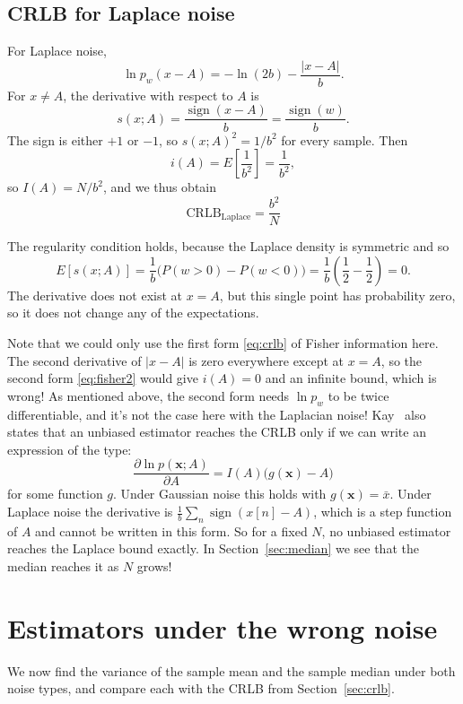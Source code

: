 \documentclass[11pt]{article}
\numberwithin{figure}{section}
\numberwithin{equation}{section}
\begin{document}
\subsection{CRLB for Laplace noise}

For Laplace noise,
\[
  \ln p_w(x - A) = -\ln(2b) - \frac{|x - A|}{b}.
\]
For $x \neq A$, the derivative with respect to $A$ is
\[
  s(x; A) = \frac{\operatorname{sign}(x - A)}{b} = \frac{\operatorname{sign}(w)}{b}.
\]
The sign is either $+1$ or $-1$, so $s(x; A)^2 = 1/b^2$ for every sample. Then
\[
  i(A) = E\!\left[\frac{1}{b^2}\right] = \frac{1}{b^2},
\]
so $I(A) = N/b^2$, and we thus obtain
\[
  \boxed{\text{CRLB}_{\text{Laplace}} = \frac{b^2}{N}}
\]

The regularity condition holds, because the Laplace density is symmetric and so
\[
  E[s(x; A)] = \frac{1}{b}\bigl(P(w > 0) - P(w < 0)\bigr) = \frac{1}{b}\left(\frac{1}{2} - \frac{1}{2}\right) = 0.
\]
The derivative does not exist at $x = A$, but this single point has probability zero, so it does
not change any of the expectations.

Note that we could only use the first form \eqref{eq:crlb} of Fisher information here. The second derivative of $|x - A|$ is zero everywhere except at $x = A$, so the second form
\eqref{eq:fisher2} would give $i(A) = 0$ and an infinite bound, which is wrong! As mentioned above, the second form needs $\ln p_w$ to be twice differentiable, and it's not the case here with the Laplacian noise!
\newline
Kay~\cite{kay} also states that an unbiased estimator reaches the CRLB only if we can write an expression of the type:
\[
  \frac{\partial \ln p(\mathbf{x}; A)}{\partial A} = I(A)\bigl(g(\mathbf{x}) - A\bigr)
\]
for some function $g$. Under Gaussian noise this holds with $g(\mathbf{x}) = \bar x$. Under Laplace noise the derivative is $\frac{1}{b}\sum_n \operatorname{sign}(x[n] - A)$, which is a
step function of $A$ and cannot be written in this form. So for a fixed $N$, no unbiased estimator reaches the Laplace
bound exactly. In Section~\ref{sec:median} we see that the median reaches it as $N$ grows!

\section{Estimators under the wrong noise}
\label{sec:mismatch}

We now find the variance of the sample mean and the sample median under both noise types, and
compare each with the CRLB from Section~\ref{sec:crlb}.
\end{document}
